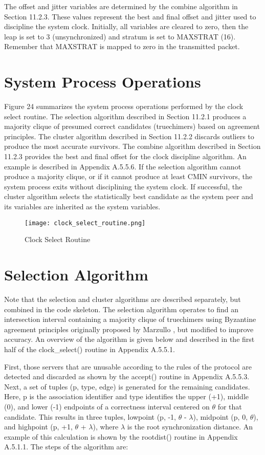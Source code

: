 The offset and jitter variables are determined by the combine
algorithm in Section 11.2.3.  These values represent the best and
final offset and jitter used to discipline the system clock.
Initially, all variables are cleared to zero, then the leap is set to
3 (unsynchronized) and stratum is set to MAXSTRAT (16).  Remember
that MAXSTRAT is mapped to zero in the transmitted packet.

\section{System Process Operations}

Figure 24 summarizes the system process operations performed by the
clock select routine.  The selection algorithm described in
Section 11.2.1 produces a majority clique of presumed correct
candidates (truechimers) based on agreement principles.  The cluster
algorithm described in Section 11.2.2 discards outliers to produce
the most accurate survivors.  The combine algorithm described in
Section 11.2.3 provides the best and final offset for the clock
discipline algorithm.  An example is described in Appendix A.5.5.6.
If the selection algorithm cannot produce a majority clique, or if it
cannot produce at least CMIN survivors, the system process exits
without disciplining the system clock.  If successful, the cluster
algorithm selects the statistically best candidate as the system peer
and its variables are inherited as the system variables.

\begin{figure}
\centering
\texttt{[image: clock\_select\_routine.png]}
\caption{Clock Select Routine}
\label{clock_select_routine}
\end{figure}

\section{Selection Algorithm}

Note that the selection and cluster algorithms are described
separately, but combined in the code skeleton.  The selection
algorithm operates to find an intersection interval containing a
majority clique of truechimers using Byzantine agreement principles
originally proposed by Marzullo \cite{ref6}, but modified to improve
accuracy.  An overview of the algorithm is given below and described
in the first half of the clock\_select() routine in Appendix A.5.5.1.

First, those servers that are unusable according to the rules of the
protocol are detected and discarded as shown by the accept() routine
in Appendix A.5.5.3.  Next, a set of tuples (p, type, edge) is
generated for the remaining candidates.  Here, p is the association
identifier and type identifies the upper (+1), middle (0), and lower
(-1) endpoints of a correctness interval centered on $ \theta $ for that
candidate.  This results in three tuples, lowpoint (p, -1, $ \theta $ -
$ \lambda $), midpoint (p, 0, $ \theta $), and highpoint (p, +1, $ \theta $ +
$ \lambda $), where $ \lambda $ is the root synchronization distance.  An
example of this calculation is shown by the rootdist() routine in
Appendix A.5.1.1.  The steps of the algorithm are:

